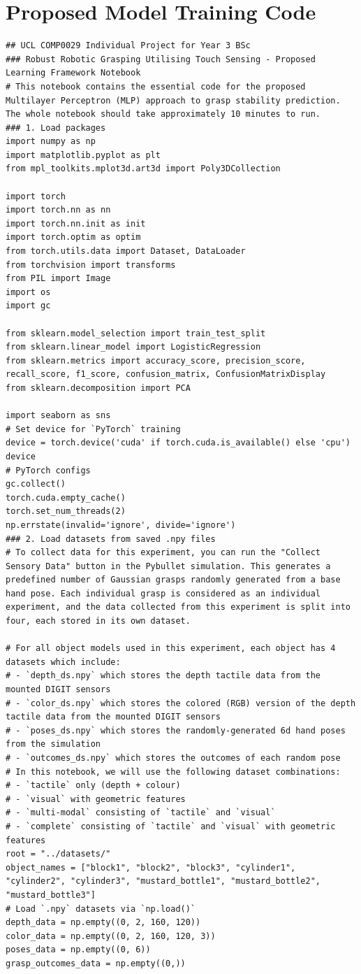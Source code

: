 \documentclass[11pt, a4paper]{report}
\begin{document}
\section{Proposed Model Training Code}
\begin{lstlisting}
## UCL COMP0029 Individual Project for Year 3 BSc
### Robust Robotic Grasping Utilising Touch Sensing - Proposed Learning Framework Notebook
# This notebook contains the essential code for the proposed Multilayer Perceptron (MLP) approach to grasp stability prediction. The whole notebook should take approximately 10 minutes to run.
### 1. Load packages
import numpy as np
import matplotlib.pyplot as plt
from mpl_toolkits.mplot3d.art3d import Poly3DCollection

import torch
import torch.nn as nn
import torch.nn.init as init
import torch.optim as optim
from torch.utils.data import Dataset, DataLoader
from torchvision import transforms
from PIL import Image
import os
import gc

from sklearn.model_selection import train_test_split
from sklearn.linear_model import LogisticRegression
from sklearn.metrics import accuracy_score, precision_score, recall_score, f1_score, confusion_matrix, ConfusionMatrixDisplay
from sklearn.decomposition import PCA

import seaborn as sns
# Set device for `PyTorch` training
device = torch.device('cuda' if torch.cuda.is_available() else 'cpu')
device
# PyTorch configs
gc.collect()
torch.cuda.empty_cache()
torch.set_num_threads(2)
np.errstate(invalid='ignore', divide='ignore')
### 2. Load datasets from saved .npy files
# To collect data for this experiment, you can run the "Collect Sensory Data" button in the Pybullet simulation. This generates a predefined number of Gaussian grasps randomly generated from a base hand pose. Each individual grasp is considered as an individual experiment, and the data collected from this experiment is split into four, each stored in its own dataset.

# For all object models used in this experiment, each object has 4 datasets which include:
# - `depth_ds.npy` which stores the depth tactile data from the mounted DIGIT sensors
# - `color_ds.npy` which stores the colored (RGB) version of the depth tactile data from the mounted DIGIT sensors
# - `poses_ds.npy` which stores the randomly-generated 6d hand poses from the simulation
# - `outcomes_ds.npy` which stores the outcomes of each random pose
# In this notebook, we will use the following dataset combinations:
# - `tactile` only (depth + colour)
# - `visual` with geometric features
# - `multi-modal` consisting of `tactile` and `visual`
# - `complete` consisting of `tactile` and `visual` with geometric features
root = "../datasets/"
object_names = ["block1", "block2", "block3", "cylinder1", "cylinder2", "cylinder3", "mustard_bottle1", "mustard_bottle2", "mustard_bottle3"]
# Load `.npy` datasets via `np.load()`
depth_data = np.empty((0, 2, 160, 120))
color_data = np.empty((0, 2, 160, 120, 3))
poses_data = np.empty((0, 6))
grasp_outcomes_data = np.empty((0,))


\end{lstlisting}
\end{document}
